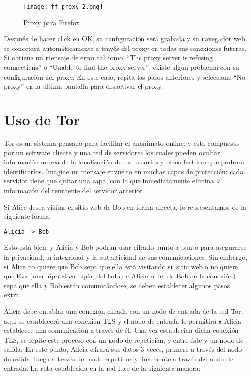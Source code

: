 \documentclass[10pt,a5paper,twoside,,]{book}
\begin{document}
\begin{figure}[htbp]
\centering
\texttt{[image: ff\_proxy\_2.png]}
\caption{Proxy para Firefox}
\end{figure}

Después de hacer click en OK, su configuración será grabada y su
navegador web se conectará automáticamente a través del proxy en todas
sus conexiones futuras. Si obtiene un mensaje de error tal como, ``The
proxy server is refusing connections'' o ``Unable to find the proxy
server'', existe algún problema con su configuración del proxy. En este
caso, repita los pasos anteriores y seleccione ``No proxy'' en la última
pantalla para desactivar el proxy.

\chapter{Uso de Tor}\label{uso-de-tor}

Tor es un sistema pensado para facilitar el anonimato online, y está
compuesto por un software cliente y una red de servidores los cuales
pueden ocultar información acerca de la localización de los usuarios y
otros factores que podrían identificarlos. Imagine un mensaje envuelto
en muchas capas de protección: cada servidor tiene que quitar una capa,
con lo que inmediatamente elimina la información del remitente del
servidor anterior.

Si Alice desea visitar el sitio web de Bob en forma directa, lo
representamos de la siguiente forma:

\begin{verbatim}
Alicia -> Bob
\end{verbatim}

Esto está bien, y Alicia y Bob podrán usar cifrado punto a punto para
asegurarse la privacidad, la integridad y la autenticidad de sus
comunicaciones. Sin embargo, si Alice no quiere que Bob sepa que ella
está visitando su sitio web o no quiere que Eva (una hipotética espía,
del lado de Alicia o del de Bob en la conexión) sepa que ella y Bob
están comunicándose, se deben establecer algunos pasos extra.

Alicia debe entablar una conexión cifrada con un nodo de entrada de la
red Tor, aquí se establecerá una conexión TLS y el nodo de entrada le
permitirá a Alicia establecer una comunicación a través de él. Una vez
establecida dicha conexión TLS, se repite este proceso con un nodo de
repetición, y entre éste y un nodo de salida. En este punto, Alicia
cifrará sus datos 3 veces, primero a través del nodo de salida, luego a
través del nodo repetidor y finalmente a través del nodo de entrada. La
ruta establecida en la red luce de la siguiente manera:
\end{document}
